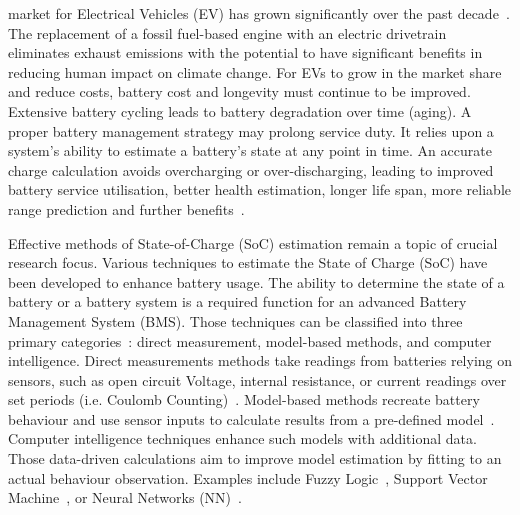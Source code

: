  market for Electrical Vehicles (EV) has grown significantly over the past decade~\cite{state-ev-australia}.
The replacement of a fossil fuel-based engine with an electric drivetrain eliminates exhaust emissions with the potential to have significant benefits in reducing human impact on climate change.
For EVs to grow in the market share and reduce costs, battery cost and longevity must continue to be improved.
Extensive battery cycling leads to battery degradation over time (aging).
A proper battery management strategy may prolong service duty.
It relies upon a system's ability to estimate a battery's state at any point in time.
An accurate charge calculation avoids overcharging or over-discharging, leading to improved battery service utilisation, better health estimation, longer life span, more reliable range prediction and further benefits~\cite{calif_proper_2008}.

%
%
Effective methods of State-of-Charge (SoC) estimation remain a topic of crucial research focus.
Various techniques to estimate the State of Charge (SoC) have been developed to enhance battery usage.
The ability to determine the state of a battery or a battery system is a required function for an advanced Battery Management System (BMS).
Those techniques can be classified into three primary categories~\cite{ali_towards_2019,ng_enhanced_2009,robust_SoC,6953745}: direct measurement, model-based methods, and computer intelligence.
Direct measurements methods take readings from batteries relying on sensors, such as open circuit Voltage, internal resistance, or current readings over set periods (i.e. Coulomb Counting)~\cite{ng_enhanced_2009,robust_SoC}.
Model-based methods recreate battery behaviour and use sensor inputs to calculate results from a pre-defined model~\cite{6953745}.
Computer intelligence techniques enhance such models with additional data.
Those data-driven calculations aim to improve model estimation by fitting to an actual behaviour observation.
Examples include Fuzzy Logic~\cite{malkhandi_fuzzy_2006}, Support Vector Machine~\cite{hansen_support_2005, anton_battery_2013}, or Neural Networks (NN)~\cite{song_lithium-ion_2018,Chemali2017,mamo_long_2020,jiao_gru-rnn_2020,xiao_accurate_2019,javid_adaptive_2020,zhang_deep_2020}.

